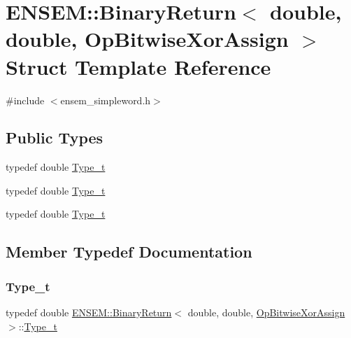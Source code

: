 \hypertarget{structENSEM_1_1BinaryReturn_3_01double_00_01double_00_01OpBitwiseXorAssign_01_4}{}\section{E\+N\+S\+EM\+:\+:Binary\+Return$<$ double, double, Op\+Bitwise\+Xor\+Assign $>$ Struct Template Reference}
\label{structENSEM_1_1BinaryReturn_3_01double_00_01double_00_01OpBitwiseXorAssign_01_4}


{\ttfamily \#include $<$ensem\+\_\+simpleword.\+h$>$}

\subsection*{Public Types}
\begin{DoxyCompactItemize}
\item 
typedef double \mbox{\hyperlink{structENSEM_1_1BinaryReturn_3_01double_00_01double_00_01OpBitwiseXorAssign_01_4_abd2a3f0619e394d328f98f130fc26e87}{Type\+\_\+t}}
\item 
typedef double \mbox{\hyperlink{structENSEM_1_1BinaryReturn_3_01double_00_01double_00_01OpBitwiseXorAssign_01_4_abd2a3f0619e394d328f98f130fc26e87}{Type\+\_\+t}}
\item 
typedef double \mbox{\hyperlink{structENSEM_1_1BinaryReturn_3_01double_00_01double_00_01OpBitwiseXorAssign_01_4_abd2a3f0619e394d328f98f130fc26e87}{Type\+\_\+t}}
\end{DoxyCompactItemize}


\subsection{Member Typedef Documentation}
\mbox{\label{structENSEM_1_1BinaryReturn_3_01double_00_01double_00_01OpBitwiseXorAssign_01_4_abd2a3f0619e394d328f98f130fc26e87}} 
\subsubsection{\texorpdfstring{Type\_t}{Type\_t}\hspace{0.1cm}{\footnotesize\ttfamily [1/3]}}
{\footnotesize\ttfamily typedef double \mbox{\hyperlink{structENSEM_1_1BinaryReturn}{E\+N\+S\+E\+M\+::\+Binary\+Return}}$<$ double, double, \mbox{\hyperlink{structENSEM_1_1OpBitwiseXorAssign}{Op\+Bitwise\+Xor\+Assign}} $>$\+::\mbox{\hyperlink{structENSEM_1_1BinaryReturn_3_01double_00_01double_00_01OpBitwiseXorAssign_01_4_abd2a3f0619e394d328f98f130fc26e87}{Type\+\_\+t}}}

